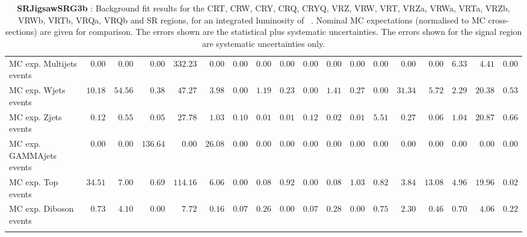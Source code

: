 \begin{table}
{\begin{tabular*}{\textwidth}{@{\extracolsep{\fill}}lrrrrrrrrrrrrrrrrr}
\noalign{\smallskip}\hline\noalign{\smallskip}
        MC exp. Multijets events         & $0.00$          & $0.00$          & $0.00$          & $332.23$          & $0.00$          & $0.00$          & $0.00$          & $0.00$          & $0.00$          & $0.00$          & $0.00$          & $0.00$          & $0.00$          & $0.00$          & $6.33$          & $4.41$          & $0.00$              \\
        MC exp. Wjets events         & $10.18$          & $54.56$          & $0.38$          & $47.27$          & $3.98$          & $0.00$          & $1.19$          & $0.23$          & $0.00$          & $1.41$          & $0.27$          & $0.00$          & $31.34$          & $5.72$          & $2.29$          & $20.38$          & $0.53$              \\
        MC exp. Zjets events         & $0.12$          & $0.55$          & $0.05$          & $27.78$          & $1.03$          & $0.10$          & $0.01$          & $0.01$          & $0.12$          & $0.02$          & $0.01$          & $5.51$          & $0.27$          & $0.06$          & $1.04$          & $20.87$          & $0.66$              \\
        MC exp. GAMMAjets events         & $0.00$          & $0.00$          & $136.64$          & $0.00$          & $26.08$          & $0.00$          & $0.00$          & $0.00$          & $0.00$          & $0.00$          & $0.00$          & $0.00$          & $0.00$          & $0.00$          & $0.00$          & $0.00$          & $0.00$              \\
        MC exp. Top events         & $34.51$          & $7.00$          & $0.69$          & $114.16$          & $6.06$          & $0.00$          & $0.08$          & $0.92$          & $0.00$          & $0.08$          & $1.03$          & $0.82$          & $3.84$          & $13.08$          & $4.96$          & $19.96$          & $0.02$              \\
        MC exp. Diboson events         & $0.73$          & $4.10$          & $0.00$          & $7.72$          & $0.16$          & $0.07$          & $0.26$          & $0.00$          & $0.07$          & $0.28$          & $0.00$          & $0.75$          & $2.30$          & $0.46$          & $0.70$          & $4.06$          & $0.22$              \\
\noalign{\smallskip}\hline\noalign{\smallskip}
\end{tabular*}
}
\caption{{\bf SRJigsawSRG3b} : Background fit results for the CRT, CRW, CRY, CRQ, CRYQ, VRZ, VRW, VRT, VRZa, VRWa, VRTa, VRZb, VRWb, VRTb, VRQa, VRQb and SR regions, for an integrated luminosity of \ourintlumi~\ifb. Nominal MC expectations (normalised to MC cross-sections) are given for comparison. The errors shown are the statistical plus systematic uncertainties. The errors shown for the signal region are systematic uncertainties only.}
\label{table.results.systematics.in.logL.fit.CRT.CRW.CRY.CRQ.CRYQ.VRZ.VRW.VRT.VRZa.VRWa.VRTa.VRZb.VRWb.VRTb.VRQa.VRQb.SR.SRJigsawSRG3b}
\end{table}
%